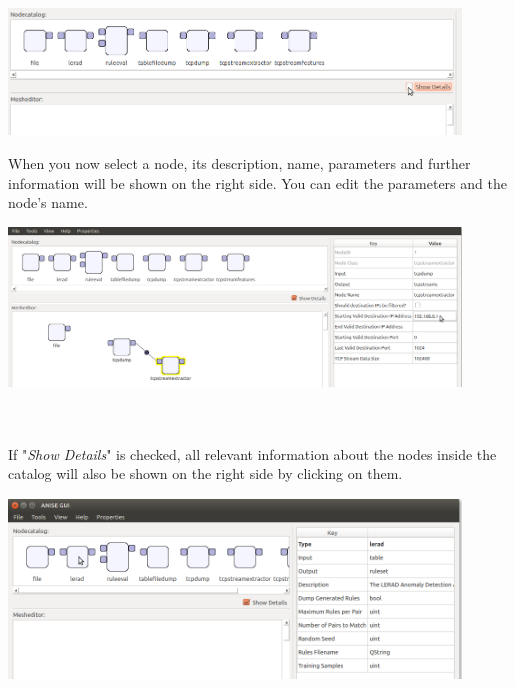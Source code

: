 \documentclass[12pt, accentcolor=tud1b]{tudreport}
\begin{document}
\begin{center}\includegraphics[width=0.9\textwidth]{uncheck_details_cut}\end{center}
\noindent
When you now select a node, its description, name, parameters and further information will be
shown on the right side. You can edit the parameters and the node's name.
\begin{center}\includegraphics[width=0.9\textwidth]{change_parameters_cut}\end{center} 
\noindent \\ \\
If "\emph{Show Details}" is checked, all relevant information about the nodes inside the catalog will also
be shown on the right side by clicking on them.
\begin{center}\includegraphics[width=0.9\textwidth]{type_info_cut}\end{center} 
\newpage
\end{document}

